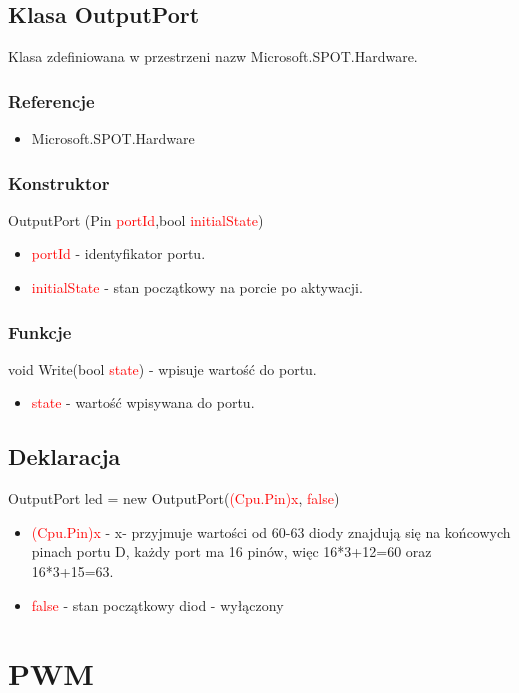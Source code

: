 \documentclass{article}
\begin{document}
\subsection{Klasa OutputPort}
Klasa zdefiniowana w przestrzeni nazw Microsoft.SPOT.Hardware.
\subsubsection{Referencje}
\begin{itemize}
\item Microsoft.SPOT.Hardware
\end{itemize}
\subsubsection{Konstruktor}
 OutputPort (Pin \textcolor{red}{portId},bool \textcolor{red}{initialState})
\begin{itemize}
\item \textcolor{red}{portId} - identyfikator portu.
\item \textcolor{red}{initialState} - stan początkowy na porcie po aktywacji.
\end{itemize}
\subsubsection{Funkcje}
void Write(bool \textcolor{red}{state}) - wpisuje wartość do portu.
\begin{itemize}
\item \textcolor{red}{state} - wartość wpisywana do portu.
\end{itemize}
\subsection{Deklaracja}
OutputPort led = new OutputPort(\space \textcolor{red}{(Cpu.Pin)x},\space \textcolor{red}{ false})
\begin{itemize}
\item \textcolor{red}{(Cpu.Pin)x} - x- przyjmuje wartości od 60-63 diody znajdują się na \newline końcowych pinach portu D, każdy port ma 16 pinów, więc 16*3+12=60 oraz 16*3+15=63.
\item \textcolor{red}{false} - stan początkowy diod - wyłączony
\end{itemize}

\section{PWM}
\end{document}

